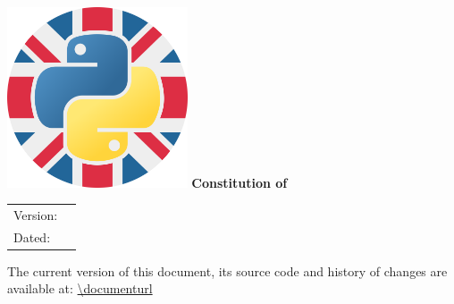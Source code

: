 
\hypersetup{pageanchor=false}
\begin{titlepage}

    \begin{center}
        \includegraphics[draft=false, width=0.4\textwidth]{logo.png}
        \vfill
        \bfseries \huge \textcolor{UKPUABlue} {Constitution of \name{}}
        \vfill
    \end{center}

    \begin{tabular}{l l}
        Version: & \version{}\\
        Dated: & \releasedate{}\\
    \end{tabular}
    \vfill
    The current version of this document, its source code and history of changes are available at: \url{\documenturl}

\end{titlepage}
